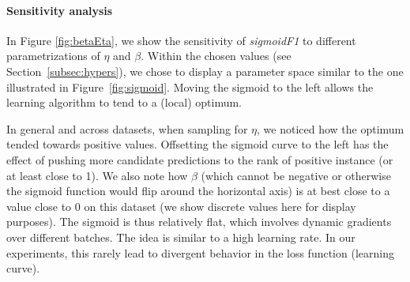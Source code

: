 \paragraph{Sensitivity analysis}

In Figure \ref{fig:betaEta}, we show the sensitivity of \emph{sigmoidF1} to different para\-metrizations of $\eta$ and $\beta$. Within the chosen values (see Section~\ref{subsec:hypers}), we chose to display a parameter space similar to the one illustrated in Figure~\ref{fig:sigmoid}. Moving the sigmoid to the left allows the learning algorithm to tend to a (local) optimum.

In general and across datasets, when sampling for $\eta$, we noticed how the optimum tended towards positive values. Offsetting the sigmoid curve to the left has the effect of pushing more candidate predictions to the rank of positive instance (or at least close to 1). We also note how $\beta$ (which cannot be negative or otherwise the sigmoid function would flip around the horizontal axis) is at best close to a value close to 0 on this dataset (we show discrete values here for display purposes). The sigmoid is thus relatively flat, which involves dynamic gradients over different batches. The idea is similar to a high learning rate. In our experiments, this rarely lead to divergent behavior in the loss function (learning curve).







